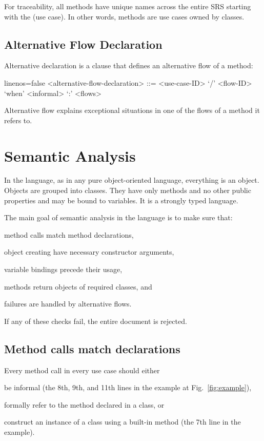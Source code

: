 \documentclass[sigplan,10pt]{acmart}
\begin{document}
For traceability, all methods have unique names across the entire
SRS starting with the  (use case). In other words,
methods are use cases owned by classes.

\subsection{Alternative Flow Declaration}

Alternative declaration is a clause that defines an alternative
flow of a method:

\begin{ffcode*}{linenos=false}
<alternative-flow-declaration> ::=
  <use-case-ID> `/' <flow-ID>
  `when' <informal> `:' <flows>
\end{ffcode*}

Alternative flow explains exceptional situations in one of the
flows of a method it refers to.

\section{Semantic Analysis}
\label{sec:semantic}

In the language, as in any pure object-oriented language, everything is
an object. Objects are grouped into classes. They have only methods
and no other public properties and may be bound to variables.
It is a strongly typed language.

The main goal of semantic analysis in the language is to make sure that:
\begin{inparaenum}
\item method calls match method declarations,
\item object creating have necessary constructor arguments,
\item variable bindings precede their usage,
\item methods return objects of required classes, and
\item failures are handled by alternative flows.
\end{inparaenum}
If any of these checks fail, the entire document is rejected.

\subsection{Method calls match declarations}

Every method call in every use case should either
\begin{inparaenum}
\item be informal (the 8th, 9th, and 11th lines in the example at Fig.~\ref{fig:example}),
\item formally refer to the method declared in a class, or
\item construct an instance of a class using a built-in method  (the 7th line in the example).
\end{inparaenum}
\end{document}
